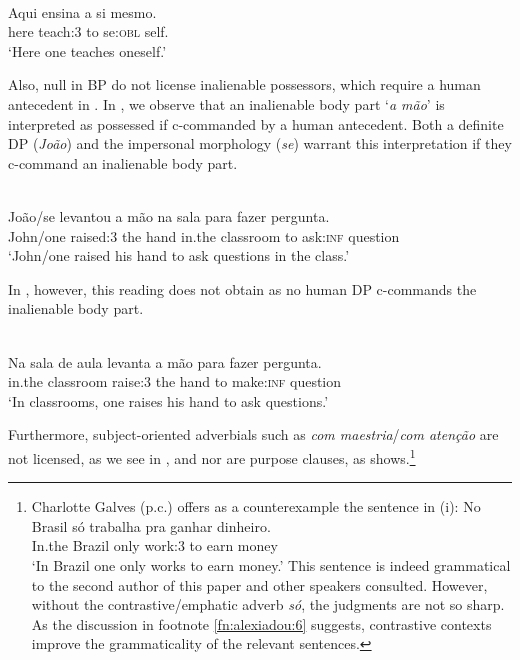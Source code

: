 \documentclass[output=paper]{LSP/langsci}
\begin{document}
\ea\label{ex:13.alexiadou}
\\
\gll {\upshape *} Aqui ensina {a si} mesmo.\\
     {} here teach:3 to se:\textsc{obl} self.\\
\glt ‘Here one teaches oneself.’
\z


Also, null  in BP do not license inalienable possessors, which require a human antecedent in . In , we observe that an inalienable body part ‘\textit{a mão}’ is interpreted as possessed if c-commanded by a human antecedent. Both a definite DP (\textit{João}) and the impersonal morphology (\textit{se}) warrant this interpretation if they c-command an inalienable body part.


\ea\label{ex:14.alexiadou}
\\
\gll João/se levantou a mão na sala para fazer pergunta.\\
 John/one raised:3 the hand in.the classroom to ask:\textsc{inf} question\\
\glt ‘John/one raised his hand to ask questions in the class.’
\z


In , however, this reading does not obtain as no human DP c-commands the inalienable body part.

\ea\label{ex:15.alexiadou}
\\
 Na {sala de aula} levanta a mão para fazer pergunta.\upshape\footnotemark{}\\
 {} in.the classroom raise:3 the hand to make:\textsc{inf} question\\
\glt ‘In classrooms, one raises his hand to ask questions.’
\z
{}

\newpage
Furthermore, subject-oriented adverbials such as \textit{com maestria}/\textit{com atenção} are not licensed, as we see in , and nor are purpose clauses, as  shows.\footnote{Charlotte Galves (p.c.) offers as a counterexample the sentence in (i): 
\ea\label{ex:i.alexiadou}
\gll No Brasil só trabalha pra ganhar dinheiro.\\
 In.the Brazil only work:3 to earn money\\
\glt ‘In Brazil one only works to earn money.’
\z
This sentence is indeed grammatical to the second author of this paper and other speakers consulted. However, without the contrastive/emphatic adverb \textit{só}, the judgments are not so sharp. As the discussion in footnote \ref{fn:alexiadou:6} suggests, contrastive contexts improve the grammaticality of the relevant sentences.}
\end{document}

